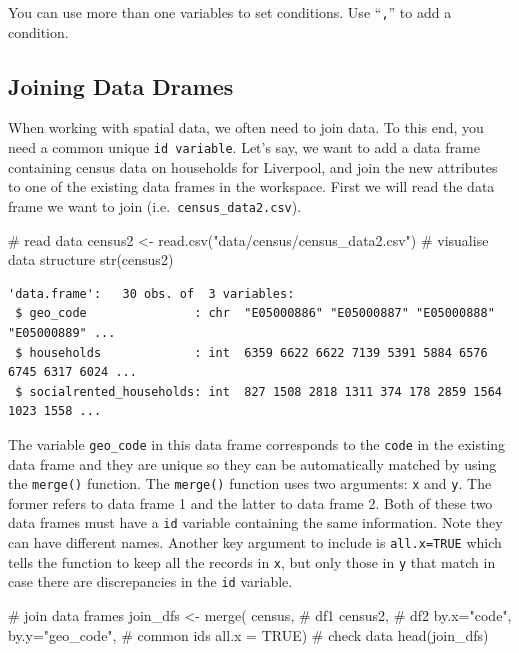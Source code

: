 \documentclass[
  letterpaper,
  DIV=11,
  numbers=noendperiod,
  oneside]{scrreprt}
\newenvironment{Shaded}{\begin{snugshade}}{\end{snugshade}}
\newcommand{\AttributeTok}[1]{\textcolor[rgb]{0.40,0.45,0.13}{#1}}
\newcommand{\CommentTok}[1]{\textcolor[rgb]{0.37,0.37,0.37}{#1}}
\newcommand{\ConstantTok}[1]{\textcolor[rgb]{0.56,0.35,0.01}{#1}}
\newcommand{\FunctionTok}[1]{\textcolor[rgb]{0.28,0.35,0.67}{#1}}
\newcommand{\NormalTok}[1]{\textcolor[rgb]{0.00,0.23,0.31}{#1}}
\newcommand{\OtherTok}[1]{\textcolor[rgb]{0.00,0.23,0.31}{#1}}
\newcommand{\StringTok}[1]{\textcolor[rgb]{0.13,0.47,0.30}{#1}}
\begin{document}
You can use more than one variables to set conditions. Use
``\texttt{,}'' to add a condition.

\subsection{Joining Data Drames}\label{joining-data-drames}

When working with spatial data, we often need to join data. To this end,
you need a common unique \texttt{id\ variable}. Let's say, we want to
add a data frame containing census data on households for Liverpool, and
join the new attributes to one of the existing data frames in the
workspace. First we will read the data frame we want to join
(i.e.~\texttt{census\_data2.csv}).

\begin{Shaded}
\begin{Highlighting}[]
\CommentTok{\# read data}
\NormalTok{census2 }\OtherTok{\textless{}{-}} \FunctionTok{read.csv}\NormalTok{(}\StringTok{"data/census/census\_data2.csv"}\NormalTok{)}
\CommentTok{\# visualise data structure}
\FunctionTok{str}\NormalTok{(census2)}
\end{Highlighting}
\end{Shaded}

\begin{verbatim}
'data.frame':   30 obs. of  3 variables:
 $ geo_code               : chr  "E05000886" "E05000887" "E05000888" "E05000889" ...
 $ households             : int  6359 6622 6622 7139 5391 5884 6576 6745 6317 6024 ...
 $ socialrented_households: int  827 1508 2818 1311 374 178 2859 1564 1023 1558 ...
\end{verbatim}

The variable \texttt{geo\_code} in this data frame corresponds to the
\texttt{code} in the existing data frame and they are unique so they can
be automatically matched by using the \texttt{merge()} function. The
\texttt{merge()} function uses two arguments: \texttt{x} and \texttt{y}.
The former refers to data frame 1 and the latter to data frame 2. Both
of these two data frames must have a \texttt{id} variable containing the
same information. Note they can have different names. Another key
argument to include is \texttt{all.x=TRUE} which tells the function to
keep all the records in \texttt{x}, but only those in \texttt{y} that
match in case there are discrepancies in the \texttt{id} variable.

\begin{Shaded}
\begin{Highlighting}[]
\CommentTok{\# join data frames}
\NormalTok{join\_dfs }\OtherTok{\textless{}{-}} \FunctionTok{merge}\NormalTok{( census, }\CommentTok{\# df1}
\NormalTok{                   census2, }\CommentTok{\# df2}
                   \AttributeTok{by.x=}\StringTok{"code"}\NormalTok{, }\AttributeTok{by.y=}\StringTok{"geo\_code"}\NormalTok{, }\CommentTok{\# common ids}
                   \AttributeTok{all.x =} \ConstantTok{TRUE}\NormalTok{)}
\CommentTok{\# check data}
\FunctionTok{head}\NormalTok{(join\_dfs)}
\end{Highlighting}
\end{Shaded}
\end{document}
